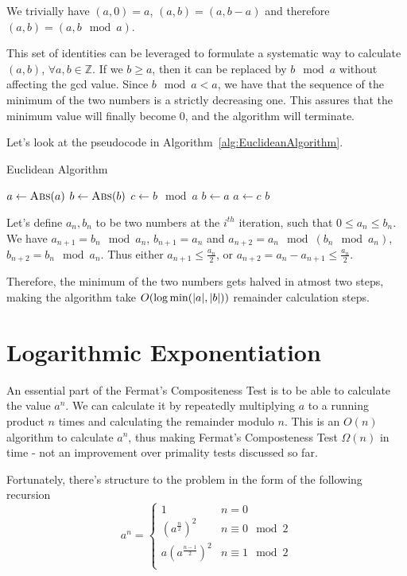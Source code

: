 \documentclass[11pt]{article}
\DeclarePairedDelimiter\abs{\lvert}{\rvert}
\begin{document}
We trivially have $(a,0) = a$, $(a,b) = (a,b-a)$ and therefore $(a,b) = (a,b \mod a)$. 

This set of identities can be leveraged to formulate a systematic way to calculate $(a,b)$, $\forall a, b \in \mathbb{Z}$. If we $b \geq a$, then it can be replaced by $b \mod a$ without affecting the gcd value. Since $b \mod a < a$, we have that the sequence of the minimum of the two numbers is a strictly decreasing one. This assures that the minimum value will finally become $0$, and the algorithm will terminate.

Let's look at the pseudocode in Algorithm~\ref{alg:EuclideanAlgorithm}.

\begin{algorithm}
\caption{Euclidean Algorithm}
\label{alg:EuclideanAlgorithm}
\begin{algorithmic}
\State $a \gets \Call{Abs}{a}$
\State $b \gets \Call{Abs}{b}$ 
	\State {} 
\EndIf
{}
	\State $c \gets b \mod a$
	\State $b \gets a$
	\State $a \gets c$
\EndWhile
\State \Return $b$
\EndProcedure
\end{algorithmic}
\end{algorithm}

Let's define $a_n, b_n$ to be two numbers at the $i^{th}$ iteration, such that $0 \leq a_n \leq b_n$. We have $a_{n+1} = b_n \mod a_n$, $b_{n+1} = a_n$ and $a_{n+2} = a_n \mod (b_n \mod a_n)$, $b_{n+2} = b_n \mod a_n$. Thus either $a_{n+1} \leq \frac {a_n} 2$, or $a_{n+2} = a_n - a_{n+1} \leq \frac {a_n} 2$. 

Therefore, the minimum of the two numbers gets halved in atmost two steps, making the algorithm take $O(\log \min(\abs a,\abs b))$ remainder calculation steps.

\section{Logarithmic Exponentiation}

An essential part of the Fermat's Compositeness Test is to be able to calculate the value $a^n$. We can calculate it by repeatedly multiplying $a$ to a running product $n$ times and calculating the remainder modulo $n$. This is an $O(n)$ algorithm to calculate $a^n$, thus making Fermat's Composteness Test $\Omega(n)$ in time - not an improvement over primality tests discussed so far.

Fortunately, there's structure to the problem in the form of the following recursion
\[a^n = \begin{cases} 
      1 & n = 0 \\
      (a^{\frac n 2})^2 & n \equiv 0 \mod 2 \\
      a(a^{\frac {n-1} 2})^2 & n \equiv 1 \mod 2 \\
   \end{cases}
\]
\end{document}
